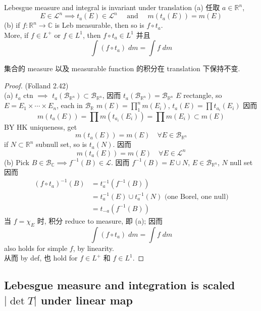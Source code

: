 \documentclass[lang=cn,11pt]{elegantbook}
\begin{document}
\begin{theorem}{Lebesgue measure and integral is invariant under translation}
(a) 任取 $a \in \mathbb{R}^n$, 
\[
E \in \mathcal{L}^n \implies  t_a(E) \in \mathcal{L}^n \quad \text{ and }\quad m(t_a(E)) = m(E)
\]
(b) if $f: \mathbb{R}^n \to \mathbb{C}$ is Leb measurable, then so is $f \circ t_a$. \\
More, if $f \in L^+$ or $f \in L^1$, then $f \circ t_a \in L^1$ 并且  \[
\int (f \circ t_a) \; dm = \int f \; dm
\]
\end{theorem}
\begin{remark}
    集合的 measure 以及 measurable function 的积分在 translation 下保持不变.
\end{remark}
\begin{proof}
    (Folland 2.42)\\
    (a)
    $t_a $ ctn $\implies$ $t_a(\mathcal{B}_{\mathbb{R}^n}) \subset \mathcal{B}_{\mathbb{R}^n}$, 因而  $t_a(\mathcal{B}_{\mathbb{R}^n})=\mathcal{B}_{\mathbb{R}^n}$
    $E$ rectangle, so $E = E_1 \times \cdots \times E_n $, each in $\mathcal{B}_\mathbb{R}$
    $m(E) = \prod_1^n m(E_i)$, $t_a(E) = \prod t_{a_i} (E_i)$ 
    因而  \[
    m(t_a(E)) = \prod m(t_{a_i} (E_i)) = \prod m(E_i) \subset m(E)
    \]
    BY HK uniqueness, get \[
    m(t_a(E)) = m(E) \quad \forall E \in \mathcal{B}_{\mathbb{R}^n}
    \]
    if $N \subset \mathbb{R}^n$ subnull set, so is $t_a(N)$. 因而 \[
    m(t_a(E)) = m(E) \quad \forall E \in \mathcal{L}^n 
    \]
    (b) Pick $B \in \mathcal{B}_\mathbb{C} \implies f^{-1}(B) \in \mathcal{L}$.
    因而 $f^{-1}(B) = E \cup N$, $E \in \mathcal{B}_{\mathbb{R}^n}$, $N$ null set
    因而 \begin{align}
        (f\circ t_a)^{-1}(B) & = t_a^{-1}( f^{-1}(B)) \\&= t_a^{-1}(E) \cup t_a^{-1}(N) \text{ (one Borel, one null)} \\
        &= t_{-a}(f^{-1}(B))
    \end{align}
当 $f= \chi_E$ 时, 积分 reduce to measure, 即 (a);
因而  \[
\int (f \circ t_a) \; dm = \int f \; dm
\] also holds for simple $f$, by linearity.\\
从而 by def, 也 hold for $f \in L^+$ 和 $f \in L^1$.
\end{proof}






\subsection{Lebesgue measure and integration is scaled $|\det T|$ under linear map }
\end{document}
